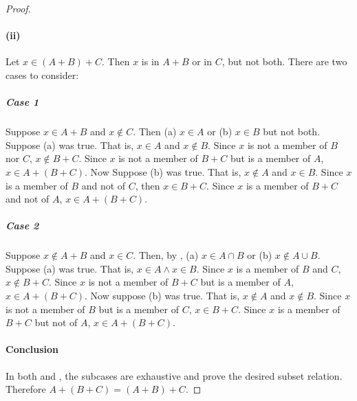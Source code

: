 \documentclass{report}
\begin{document}
\begin{proof}
    \paragraph{(ii)}%

      Let $x \in (A + B) + C$.
      Then $x$ is in $A + B$ or in $C$, but not both.
      There are two cases to consider:

      \subparagraph{Case 1}%

        Suppose $x \in A + B$ and $x \not\in C$.
        Then (a) $x \in A$ or (b) $x \in B$ but not both.
        Suppose (a) was true.
        That is, $x \in A$ and $x \not\in B$.
        Since $x$ is not a member of $B$ nor $C$, $x \not\in B + C$.
        Since $x$ is not a member of $B + C$ but is a member of $A$,
          $x \in A + (B + C)$.
        Now Suppose (b) was true.
        That is, $x \not\in A$ and $x \in B$.
        Since $x$ is a member of $B$ and not of $C$, then $x \in B + C$.
        Since $x$ is a member of $B + C$ and not of $A$, $x \in A + (B + C)$.

      \subparagraph{Case 2}%

        Suppose $x \not\in A + B$ and $x \in C$.
        Then, by ,
          (a) $x \in A \cap B$ or (b) $x \not\in A \cup B$.
        Suppose (a) was true.
        That is, $x \in A \land x \in B$.
        Since $x$ is a member of $B$ and $C$, $x \not\in B + C$.
        Since $x$ is not a member of $B + C$ but is a member of $A$,
          $x \in A + (B + C)$.
        Now suppose (b) was true.
        That is, $x \not\in A$ and $x \not\in B$.
        Since $x$ is not a member of $B$ but is a member of $C$, $x \in B + C$.
        Since $x$ is a member of $B + C$ but not of $A$, $x \in A + (B + C)$.

    \paragraph{Conclusion}%

      In both  and
        , the subcases are exhaustive and prove
        the desired subset relation.
      Therefore $A + (B + C) = (A + B) + C$.

  \end{proof}

\subsection{}%
\end{document}

